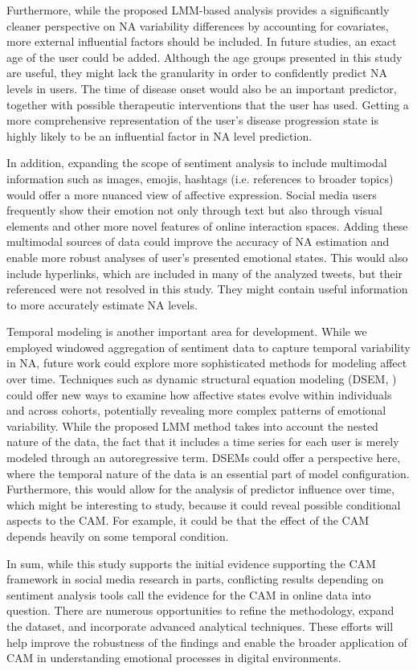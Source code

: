 Furthermore, while the proposed LMM-based analysis provides a significantly cleaner perspective on NA variability differences by accounting for covariates, more external influential factors should be included. In future studies, an exact age of the user could be added. Although the age groups presented in this study are useful, they might lack the granularity in order to confidently predict NA levels in users. The time of disease onset would also be an important predictor, together with possible therapeutic interventions that the user has used. Getting a more comprehensive representation of the user's disease progression state is highly likely to be an influential factor in NA level prediction.

In addition, expanding the scope of sentiment analysis to include multimodal information such as images, emojis, hashtags (i.e. references to broader topics) would offer a more nuanced view of affective expression. Social media users frequently show their emotion not only through text but also through visual elements and other more novel features of online interaction spaces. Adding these multimodal sources of data could improve the accuracy of NA estimation and enable more robust analyses of user's presented emotional states. This would also include hyperlinks, which are included in many of the analyzed tweets, but their referenced were not resolved in this study. They might contain useful information to more accurately estimate NA levels.

Temporal modeling is another important area for development. While we employed windowed aggregation of sentiment data to capture temporal variability in NA, future work could explore more sophisticated methods for modeling affect over time. Techniques such as dynamic structural equation modeling (DSEM, \citet{dsem}) could offer new ways to examine how affective states evolve within individuals and across cohorts, potentially revealing more complex patterns of emotional variability. While the proposed LMM method takes into account the nested nature of the data, the fact that it includes a time series for each user is merely modeled through an autoregressive term. DSEMs could offer a perspective here, where the temporal nature of the data is an essential part of model configuration. Furthermore, this would allow for the analysis of predictor influence over time, which might be interesting to study, because it could reveal possible conditional aspects to the CAM. For example, it could be that the effect of the CAM depends heavily on some temporal condition.

In sum, while this study supports the initial evidence supporting the CAM framework in social media research in parts, conflicting results depending on sentiment analysis tools call the evidence for the CAM in online data into question. There are numerous opportunities to refine the methodology, expand the dataset, and incorporate advanced analytical techniques. These efforts will help improve the robustness of the findings and enable the broader application of CAM in understanding emotional processes in digital environments.